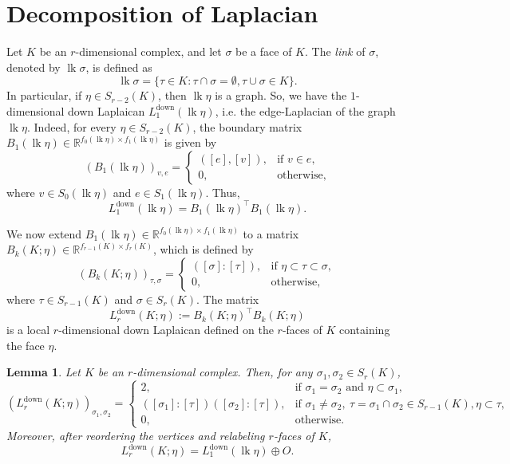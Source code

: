 \documentclass[12pt]{amsart}
\theoremstyle{plain}
\newtheorem{lem}[thm]{Lemma}
\theoremstyle{definition}
\numberwithin{equation}{section}
\numberwithin{figure}{section}
\newcommand{\Ldown}{L^{\operatorname{down}}}
\newcommand{\lk}{\operatorname{lk}}
\newcommand{\R}{\mathbb R}
\begin{document}
\section{Decomposition of Laplacian}\label{graph-decom}
Let $K$ be an $r$-dimensional complex, and let $\sigma$ be a face of $K$.
The \emph{link} of $\sigma$, denoted by $\lk \sigma$, is defined as
$$ \lk \sigma=\{\tau \in K: \tau \cap \sigma = \emptyset, \tau \cup \sigma \in K\}.$$
In particular, if $\eta \in S_{r - 2}(K)$, then
$\lk \eta$ is a graph.
So, we have the $1$-dimensional down Laplaican $\Ldown_1(\lk \eta)$, i.e. the edge-Laplacian of the graph $\lk \eta$.
Indeed, for every $\eta \in S_{r - 2}(K)$, the boundary matrix $B_1(\lk \eta) \in \R^{f_0(\lk \eta) \times f_1(\lk \eta)}$ is given by
\[
(B_1(\lk \eta))_{v,e}=
\begin{cases}
([e],[v]), & \text{if } v \in e,\\
0, & \text{otherwise},
\end{cases}
\]
where $v \in S_0(\lk \eta)$ and $e \in S_1(\lk \eta)$.
Thus,
$$ \Ldown_1(\lk \eta)=B_1(\lk \eta)^\top B_1(\lk \eta).$$

We now extend $B_1(\lk \eta) \in \R^{f_0(\lk \eta) \times f_1(\lk \eta)}$ to a matrix $B_k(K;\eta) \in \R^{f_{r - 1}(K) \times f_r(K)}$, which is defined  by
\[
(B_k(K;\eta))_{\tau,\sigma}
=
\begin{cases}
([\sigma] : [\tau]), & \text{if } \eta \subset \tau \subset \sigma,\\
0, & \text{otherwise},
\end{cases}
\]
where $\tau \in S_{r-1}(K)$ and $\sigma \in S_r(K)$.
The matrix 
$$\Ldown_r(K;\eta):= B_k(K;\eta)^\top B_k(K;\eta)$$
 is a local $r$-dimensional down Laplaican defined on the $r$-faces of $K$ containing the face $\eta$.


\begin{lem}\label{gram-entries}
Let $K$ be an $r$-dimensional complex.
Then, for any $\sigma_1,\sigma_2 \in S_r(K)$, 
\[
(\Ldown_r(K;\eta))_{\sigma_1,\sigma_2}
=
\begin{cases}
2, & \text{if } \sigma_1 = \sigma_2 \text{ and } \eta \subset \sigma_1, \\
([\sigma_1] : [\tau])([\sigma_2] : [\tau]),
& \text{if } \sigma_1 \ne \sigma_2,\ \tau = \sigma_1 \cap \sigma_2 \in S_{r - 1}(K), \eta \subset \tau, \\
0, & \text{otherwise}.
\end{cases}
\]
Moreover, after reordering the vertices and relabeling $r$-faces of $K$, 
$$ \Ldown_r(K;\eta)= \Ldown_1(\lk \eta) \oplus O.$$
\end{lem}
\end{document}
